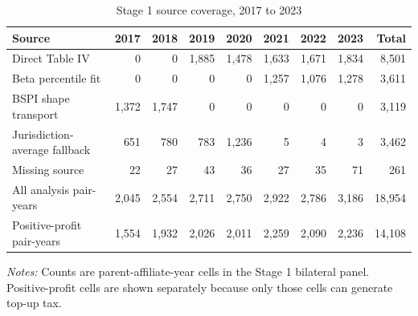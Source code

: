 \begin{table}[H]
\centering
\small
\setlength{\tabcolsep}{4pt}
\caption[Stage 1 source coverage]{Stage 1 source coverage, 2017 to 2023}
\label{tab:stage1_source_updated}
\begin{tabular}{@{}lrrrrrrrr@{}}
\toprule
Source & 2017 & 2018 & 2019 & 2020 & 2021 & 2022 & 2023 & Total \\
\midrule
Direct Table IV &     0 &     0 & 1,885 & 1,478 & 1,633 & 1,671 & 1,834 & 8,501 \\
Beta percentile fit &     0 &     0 &     0 &     0 & 1,257 & 1,076 & 1,278 & 3,611 \\
BSPI shape transport & 1,372 & 1,747 &     0 &     0 &     0 &     0 &     0 & 3,119 \\
Jurisdiction-average fallback &   651 &   780 &   783 & 1,236 &     5 &     4 &     3 & 3,462 \\
Missing source &    22 &    27 &    43 &    36 &    27 &    35 &    71 &   261 \\
All analysis pair-years & 2,045 & 2,554 & 2,711 & 2,750 & 2,922 & 2,786 & 3,186 & 18,954 \\
Positive-profit pair-years & 1,554 & 1,932 & 2,026 & 2,011 & 2,259 & 2,090 & 2,236 & 14,108 \\
\bottomrule
\end{tabular}

\vspace{0.35em}
\noindent\begin{minipage}{\textwidth}
\footnotesize\raggedright\textit{Notes:} Counts are parent-affiliate-year cells in the Stage 1 bilateral panel. Positive-profit cells are shown separately because only those cells can generate top-up tax.
\end{minipage}
\end{table}
